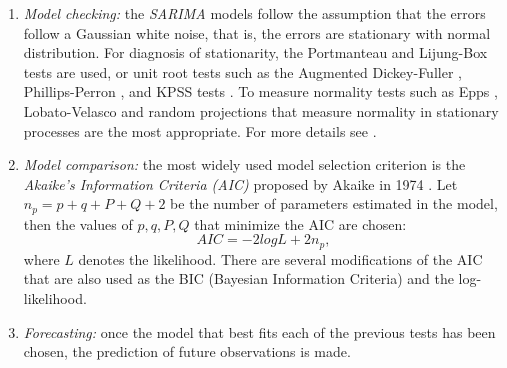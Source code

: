 \begin{enumerate}
	\item \textit{Model checking:} the \textit{SARIMA} models follow the assumption that the errors follow a Gaussian white noise, that is, the errors are stationary with normal distribution. For diagnosis of stationarity, the Portmanteau \cite{test} and Lijung-Box tests \citet{Lijung-test} are used, or unit root tests such as the Augmented Dickey-Fuller \citet{ADF}, Phillips-Perron \citet{ADF}, and KPSS tests \citet{KPSS}. To measure normality tests such as Epps \citet{Epps}, Lobato-Velasco \citet{LV} and random projections \citet{rp} that measure normality in stationary processes are the most appropriate. For more details see \citet{nortstest}.
	
	\item \textit{Model comparison: }the most widely used model selection criterion is the \textit{Akaike’s Information Criteria (AIC)} proposed by Akaike in 1974 \citet{akaike}. Let $ n_p = p + q + P + Q + 2 $ be the number of parameters estimated in the model, then the values of $ p, q, P, Q $ that minimize the AIC are chosen:
	\begin{equation}
		AIC = -2log L+2n_p,
	\end{equation}
	where $L$ denotes the likelihood. There are several modifications of the AIC that are also used as the BIC (Bayesian Information Criteria) and the log-likelihood.
	
	\item \textit{Forecasting: }once the model that best fits each of the previous tests has been chosen, the prediction of future observations is made.
\end{enumerate}
%
